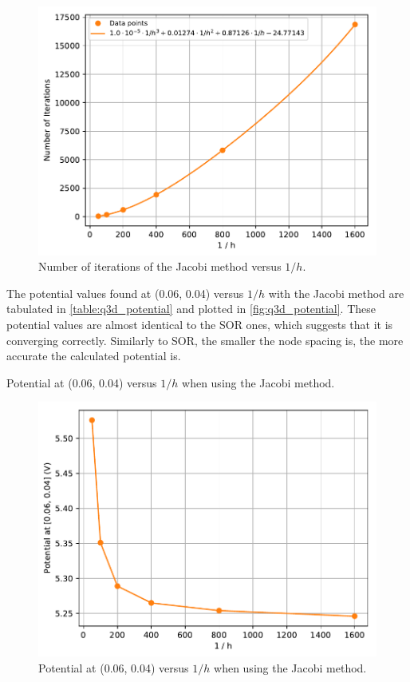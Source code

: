 \documentclass[a4paper,titlepage]{article}
\begin{document}
	\begin{figure}[!htb]
		\centering
		\includegraphics[width=\columnwidth]{plots/q3d_iterations.pdf}
		\caption
		{Number of iterations of the Jacobi method versus $1/h$.}
		\label{fig:q3d_iterations}
	\end{figure}

	The potential values found at (0.06, 0.04) versus $1/h$ with the Jacobi method are tabulated in \autoref{table:q3d_potential} and plotted in \autoref{fig:q3d_potential}. These potential values are almost identical to the SOR ones, which suggests that it is converging correctly. Similarly to SOR, the smaller the node spacing is, the more accurate the calculated potential is.

	\begin{table}[!htb]
		\centering
		\caption{Potential at (0.06, 0.04) versus $1/h$ when using the Jacobi method.}
		\label{table:q3d_potential}
	\end{table}

	\begin{figure}[!htb]
		\centering
		\includegraphics[width=\columnwidth]{plots/q3d_potential.pdf}
		\caption
		{Potential at (0.06, 0.04) versus $1/h$ when using the Jacobi method.}
		\label{fig:q3d_potential}
	\end{figure}
\end{document}
